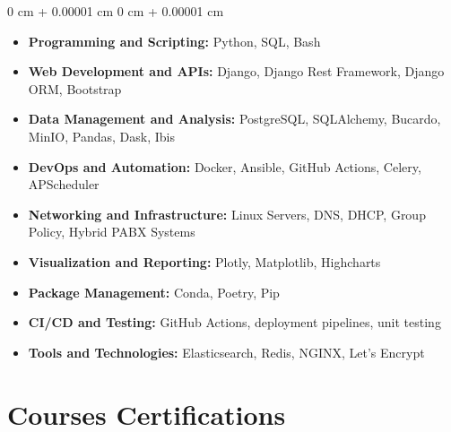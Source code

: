\documentclass[10pt, letterpaper]{article}
\newenvironment{highlights}{
    \begin{itemize}[
        topsep=0.10 cm,
        parsep=0.10 cm,
        partopsep=0pt,
        itemsep=0pt,
        leftmargin=0 cm + 10pt
    ]
}{
    \end{itemize}
} %
\newenvironment{onecolentry}{
    \begin{adjustwidth}{
        0 cm + 0.00001 cm
    }{
        0 cm + 0.00001 cm
    }
}{
    \end{adjustwidth}
} %
\begin{document}
        \begin{onecolentry}
            \begin{highlights}
        
                \item \textbf{Programming and Scripting:} Python, SQL, Bash
                \item \textbf{Web Development and APIs:} Django, Django Rest Framework, Django ORM, Bootstrap
                \item \textbf{Data Management and Analysis:} PostgreSQL, SQLAlchemy, Bucardo, MinIO, Pandas, Dask, Ibis
                \item \textbf{DevOps and Automation:} Docker, Ansible, GitHub Actions, Celery, APScheduler
                \item \textbf{Networking and Infrastructure:} Linux Servers, DNS, DHCP, Group Policy, Hybrid PABX Systems
                \item \textbf{Visualization and Reporting:} Plotly, Matplotlib, Highcharts
                \item \textbf{Package Management:} Conda, Poetry, Pip
                \item \textbf{CI/CD and Testing:} GitHub Actions, deployment pipelines, unit testing
                \item \textbf{Tools and Technologies:} Elasticsearch, Redis, NGINX, Let’s Encrypt
            \end{highlights}
        \end{onecolentry}
    
        \vspace{0.2 cm}



    \section{Courses \band Certifications}
\end{document}
